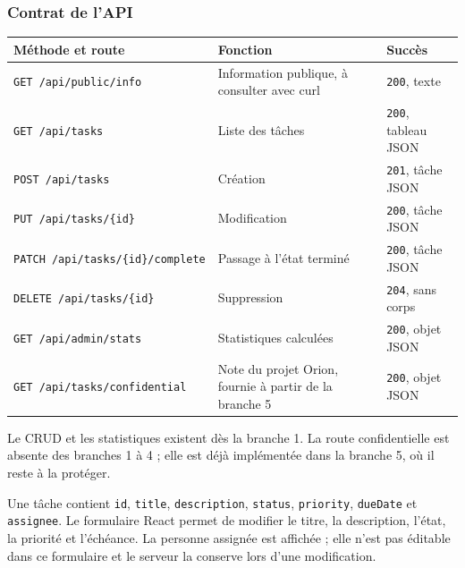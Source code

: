 \documentclass[
  french,
  10pt,
  a4paper,
]{article}
\newcounter{none} %
\begin{document}
\subsubsection{Contrat de l'API}\label{contrat-de-lapi}

{\def\LTcaptype{none} %
\begin{longtable}[]{@{}
  >{\raggedright\arraybackslash}p{}
  >{\raggedright\arraybackslash}p{}
  >{\raggedright\arraybackslash}p{}@{}}
\toprule\noalign{}
\begin{minipage}[b]{\linewidth}\raggedright
Méthode et route
\end{minipage} & \begin{minipage}[b]{\linewidth}\raggedright
Fonction
\end{minipage} & \begin{minipage}[b]{\linewidth}\raggedright
Succès
\end{minipage} \\
\midrule\noalign{}
\endhead
\bottomrule\noalign{}
\endlastfoot
\texttt{GET\ /api/public/info} & Information publique, à consulter avec
curl & \texttt{200}, texte \\
\texttt{GET\ /api/tasks} & Liste des tâches & \texttt{200}, tableau
JSON \\
\texttt{POST\ /api/tasks} & Création & \texttt{201}, tâche JSON \\
\texttt{PUT\ /api/tasks/\{id\}} & Modification & \texttt{200}, tâche
JSON \\
\texttt{PATCH\ /api/tasks/\{id\}/complete} & Passage à l'état terminé &
\texttt{200}, tâche JSON \\
\texttt{DELETE\ /api/tasks/\{id\}} & Suppression & \texttt{204}, sans
corps \\
\texttt{GET\ /api/admin/stats} & Statistiques calculées & \texttt{200},
objet JSON \\
\texttt{GET\ /api/tasks/confidential} & Note du projet Orion, fournie à
partir de la branche 5 & \texttt{200}, objet JSON \\
\end{longtable}
}

Le CRUD et les statistiques existent dès la branche 1. La route
confidentielle est absente des branches 1 à 4 ; elle est déjà
implémentée dans la branche 5, où il reste à la protéger.

Une tâche contient \texttt{id}, \texttt{title}, \texttt{description},
\texttt{status}, \texttt{priority}, \texttt{dueDate} et
\texttt{assignee}. Le formulaire React permet de modifier le titre, la
description, l'état, la priorité et l'échéance. La personne assignée est
affichée ; elle n'est pas éditable dans ce formulaire et le serveur la
conserve lors d'une modification.
\end{document}

